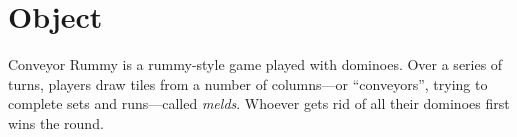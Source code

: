 \section{Object}
Conveyor Rummy is a rummy-style game played with dominoes.
Over a series of turns, players draw tiles from a number of columns---or ``conveyors'', trying to complete sets and runs---called \textit{melds}.
Whoever gets rid of all their dominoes first wins the round.